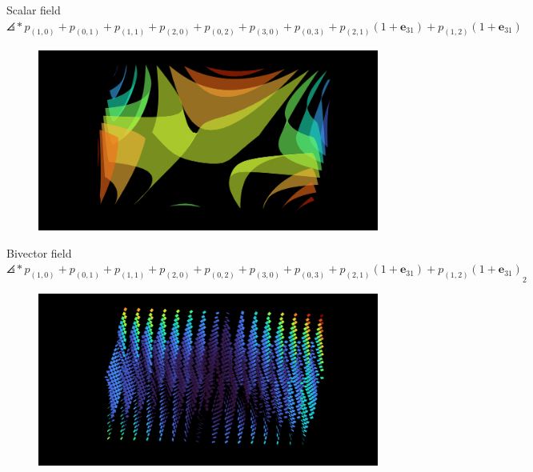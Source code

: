 \documentclass[aspectratio=169]{beamer}
\newcommand{\blade}[1]{\boldsymbol{#1}}
\DeclarePairedDelimiter\angles{\langle}{\rangle}
\newcommand{\proj}[2]{\angles*{#2}_{#1}}
\begin{document}
\begin{frame}{Scalar field}
\vfill
\hspace*{-.5cm}$\proj{}{p_{(1,0)}+p_{(0,1)} + p_{(1,1)} + p_{(2,0)} + p_{(0,2)} + p_{(3,0)} + p_{(0,3)} + p_{(2,1)} (1+\blade{e}_{31}) + p_{(1,2)} (1+\blade{e}_{31}) }$
\begin{figure}[h]
         \centering
         \includegraphics[width=\textwidth]{figures/scalar_field}
\end{figure}
\vfill
\end{frame}

\begin{frame}{Bivector field}
\vfill
\hspace*{-.5cm}$\proj{2}{p_{(1,0)}+p_{(0,1)} + p_{(1,1)} + p_{(2,0)} + p_{(0,2)} + p_{(3,0)} + p_{(0,3)} + p_{(2,1)} (1+\blade{e}_{31}) + p_{(1,2)} (1+\blade{e}_{31}) }$
\begin{figure}[h]
    \centering
    \includegraphics[width=\textwidth]{figures/plane_field}
\end{figure}
\hfill
\vfill
\end{frame}
\end{document}
